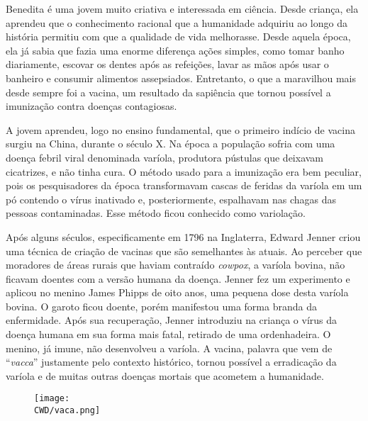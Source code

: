 %

Benedita é uma jovem muito criativa e interessada em ciência. Desde criança, ela aprendeu que o conhecimento racional que a humanidade adquiriu ao longo da história permitiu com que a qualidade de vida melhorasse. Desde aquela época, ela já sabia que fazia uma enorme diferença ações simples, como tomar banho diariamente, escovar os dentes após as refeições, lavar as mãos após usar o banheiro e consumir alimentos assepsiados. Entretanto, o que a maravilhou mais desde sempre foi a vacina, um resultado da sapiência que tornou possível a imunização contra doenças contagiosas.

A jovem aprendeu, logo no ensino fundamental, que o primeiro indício de vacina surgiu na China, durante o século X. Na época a população sofria com uma doença febril viral denominada varíola, produtora pústulas que deixavam cicatrizes, e não tinha cura. O método usado para a imunização era bem peculiar, pois os pesquisadores da época transformavam cascas de feridas da varíola em um pó contendo o vírus inativado e, posteriormente, espalhavam nas chagas das pessoas contaminadas. Esse método ficou conhecido como variolação.

Após alguns séculos, especificamente em 1796 na Inglaterra, Edward Jenner criou uma técnica de criação de vacinas que são semelhantes às atuais. Ao perceber que moradores de áreas rurais que haviam contraído \textit{cowpox}, a varíola bovina, não ficavam doentes com a versão humana da doença. Jenner fez um experimento e aplicou no menino James Phipps de oito anos, uma pequena dose desta varíola bovina. O garoto ficou doente, porém manifestou uma forma branda da enfermidade. Após sua recuperação, Jenner introduziu na criança o vírus da doença humana em sua forma mais fatal, retirado de uma ordenhadeira. O menino, já imune, não desenvolveu a varíola. A vacina, palavra que vem de ``\textit{vacca}'' justamente pelo contexto histórico, tornou possível a erradicação da varíola e de muitas outras doenças mortais que acometem a humanidade.

\begin{figure}[!htb]
	\centering
	\texttt{[image: \\CWD/vaca.png]}
\end{figure}

